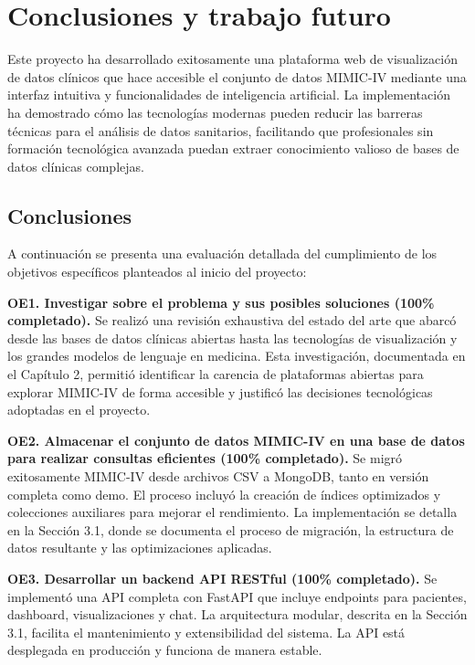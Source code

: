 \chapter{Conclusiones y trabajo futuro}

Este proyecto ha desarrollado exitosamente una plataforma web de visualización de datos clínicos que hace accesible el conjunto de datos MIMIC-IV mediante una interfaz intuitiva y funcionalidades de inteligencia artificial. La implementación ha demostrado cómo las tecnologías modernas pueden reducir las barreras técnicas para el análisis de datos sanitarios, facilitando que profesionales sin formación tecnológica avanzada puedan extraer conocimiento valioso de bases de datos clínicas complejas.

\section{Conclusiones}

A continuación se presenta una evaluación detallada del cumplimiento de los objetivos específicos planteados al inicio del proyecto:

\textbf{OE1. Investigar sobre el problema y sus posibles soluciones (100\% completado).} Se realizó una revisión exhaustiva del estado del arte que abarcó desde las bases de datos clínicas abiertas hasta las tecnologías de visualización y los grandes modelos de lenguaje en medicina. Esta investigación, documentada en el Capítulo 2, permitió identificar la carencia de plataformas abiertas para explorar MIMIC-IV de forma accesible y justificó las decisiones tecnológicas adoptadas en el proyecto.

\textbf{OE2. Almacenar el conjunto de datos MIMIC-IV en una base de datos para realizar consultas eficientes (100\% completado).} Se migró exitosamente MIMIC-IV desde archivos CSV a MongoDB, tanto en versión completa como demo. El proceso incluyó la creación de índices optimizados y colecciones auxiliares para mejorar el rendimiento. La implementación se detalla en la Sección 3.1, donde se documenta el proceso de migración, la estructura de datos resultante y las optimizaciones aplicadas.

\textbf{OE3. Desarrollar un backend API RESTful (100\% completado).} Se implementó una API completa con FastAPI que incluye endpoints para pacientes, dashboard, visualizaciones y chat. La arquitectura modular, descrita en la Sección 3.1, facilita el mantenimiento y extensibilidad del sistema. La API está desplegada en producción y funciona de manera estable.

